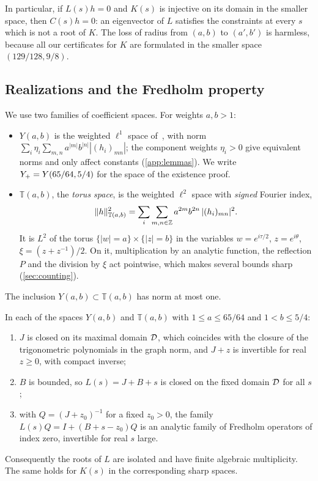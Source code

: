 In particular, if $L(s)h=0$ and $K(s)$ is injective on its domain in the smaller space, then $C(s)h=0$:
an eigenvector of $L$ satisfies the constraints at every $s$ which is not a root of $K$. The loss of
radius from $(a,b)$ to $(a',b')$ is harmless, because all our certificates for $K$ are formulated in the
smaller space $(129/128,9/8)$.

\subsection{Realizations and the Fredholm property}\label{sec:setting-realizations}

We use two families of coefficient spaces. For weights $a,b>1$:
\begin{itemize}[leftmargin=*]
\item $Y(a,b)$ is the weighted $\ell^1$ space of~\cite{RT2019}, with norm
  $\sum_i\eta_i\sum_{m,n}a^{|m|}b^{|n|}|(h_i)_{mn}|$; the component weights $\eta_i>0$ give equivalent
  norms and only affect constants (\cref{app:lemmas}). We write $Y_{+}=Y(65/64,5/4)$ for the space of the
  existence proof.
\item $\mathbb T(a,b)$, the \emph{torus space}, is the weighted $\ell^2$ space with \emph{signed} Fourier
  index,
  \[
    \|h\|^2_{\mathbb T(a,b)}=\sum_i\sum_{m,n\in\mathbb{Z}}a^{2m}b^{2n}\,|(h_i)_{mn}|^2 .
  \]
  It is $L^2$ of the torus $\{|w|=a\}\times\{|z|=b\}$ in the variables $w=e^{i\tau/2}$, $z=e^{i\theta}$,
  $\xi=(z+z^{-1})/2$. On it, multiplication by an analytic function, the reflection $P$ and the division by
  $\xi$ act pointwise, which makes several bounds sharp (\cref{sec:counting}).
\end{itemize}
The inclusion $Y(a,b)\subset\mathbb T(a,b)$ has norm at most one.

\begin{proposition}\label{prop:fredholm}
In each of the spaces $Y(a,b)$ and $\mathbb T(a,b)$ with $1\le a\le65/64$ and $1<b\le5/4$:
\begin{enumerate}[label=\textup{(\roman*)},leftmargin=*]
\item $J$ is closed on its maximal domain $\mathcal{D}$, which coincides with the closure of the trigonometric
  polynomials in the graph norm, and $J+z$ is invertible for real $z\ge0$, with compact inverse;
\item $B$ is bounded, so $L(s)=J+B+s$ is closed on the fixed domain $\mathcal{D}$ for all $s$;
\item with $Q=(J+z_0)^{-1}$ for a fixed $z_0>0$, the family $L(s)Q=I+(B+s-z_0)Q$ is an analytic
  family of Fredholm operators of index zero, invertible for real $s$ large.
\end{enumerate}
Consequently the roots of $L$ are isolated and have finite algebraic multiplicity. The same holds for
$K(s)$ in the corresponding sharp spaces.
\end{proposition}

